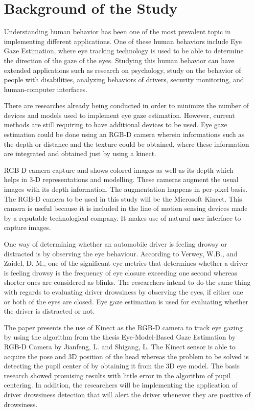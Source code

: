 \section{Background of the Study}


Understanding human behavior has been one of the most prevalent topic in implementing different applications. One of these human behaviors include Eye Gaze Estimation, where eye tracking technology is used to be able to determine the direction of the gaze of the eyes. Studying this human behavior can have extended applications such as research on psychology, study on the behavior of people with disabilities, analyzing behaviors of drivers, security monitoring, and human-computer interfaces.

There are researches already being conducted in order to minimize the number of devices and models used to implement eye gaze estimation. However, current methods are still requiring to have additional devices to be used. Eye gaze estimation could be done using an RGB-D camera wherein informations such as the depth or distance and the texture could be obtained, where these information are integrated and obtained just by using a kinect.

RGB-D camera capture and shows colored images as well as its depth which helps in 3-D representations and modelling. These cameras augment the usual images with its depth information. The augmentation happens in per-pixel basis. The RGB-D camera to be used in this study will be the Microsoft Kinect. This camera is useful because it is included in the line of motion sensing devices made by a reputable technological company. It makes use of natural user interface to capture images.

One way of determining whether an automobile driver is feeling drowsy or distracted is by observing the eye behaviour. According to Verwey, W.B., and Zaidel, D. M., one of the significant eye metrics that determines whether a driver is feeling drowsy is the frequency of eye closure exceeding one second whereas shorter ones are considered as blinks. The researchers intend to do the same thing with regards to evaluating driver drowsiness by observing the eyes, if either one or both of the eyes are closed. Eye gaze estimation is used for evaluating whether the driver is distracted or not.

The paper presents the use of Kinect as the RGB-D camera to track eye gazing by using the algorithm from the thesis Eye-Model-Based Gaze Estimation by RGB-D Camera by Jianfeng, L. and Shigang, L. The Kinect sensor is able to acquire the pose and 3D position of the head whereas the problem to be solved is detecting the pupil center of by obtaining it from the 3D eye model. The basis research showed promising results with little error in the algorithm of pupil centering. In addition, the researchers will be implementing the application of driver drowsiness detection that will alert the driver whenever they are positive of drowsiness.

